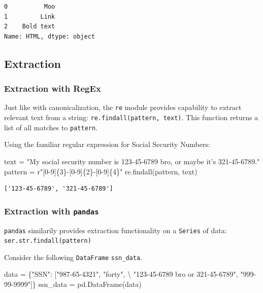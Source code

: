 \documentclass[
  letterpaper,
  DIV=11,
  numbers=noendperiod]{scrreprt}
\newenvironment{Shaded}{\begin{snugshade}}{\end{snugshade}}
\newcommand{\NormalTok}[1]{\textcolor[rgb]{0.00,0.23,0.31}{#1}}
\newcommand{\OperatorTok}[1]{\textcolor[rgb]{0.37,0.37,0.37}{#1}}
\newcommand{\SpecialCharTok}[1]{\textcolor[rgb]{0.37,0.37,0.37}{#1}}
\newcommand{\StringTok}[1]{\textcolor[rgb]{0.13,0.47,0.30}{#1}}
\newcommand{\VerbatimStringTok}[1]{\textcolor[rgb]{0.13,0.47,0.30}{#1}}
\begin{document}
\begin{verbatim}
0          Moo
1         Link
2    Bold text
Name: HTML, dtype: object
\end{verbatim}

\subsection{Extraction}\label{extraction-1}

\subsubsection{Extraction with RegEx}\label{extraction-with-regex}

Just like with canonicalization, the \texttt{re} module provides
capability to extract relevant text from a string:
\texttt{re.findall(pattern,\ text)}. This function returns a list of all
matches to \texttt{pattern}.

Using the familiar regular expression for Social Security Numbers:

\begin{Shaded}
\begin{Highlighting}[]
\NormalTok{text }\OperatorTok{=} \StringTok{"My social security number is 123{-}45{-}6789 bro, or maybe it’s 321{-}45{-}6789."}
\NormalTok{pattern }\OperatorTok{=} \VerbatimStringTok{r"[0{-}9]}\SpecialCharTok{\{3\}}\VerbatimStringTok{{-}[0{-}9]}\SpecialCharTok{\{2\}}\VerbatimStringTok{{-}[0{-}9]}\SpecialCharTok{\{4\}}\VerbatimStringTok{"}
\NormalTok{re.findall(pattern, text)  }
\end{Highlighting}
\end{Shaded}

\begin{verbatim}
['123-45-6789', '321-45-6789']
\end{verbatim}

\subsubsection{\texorpdfstring{Extraction with
\texttt{pandas}}{Extraction with pandas}}\label{extraction-with-pandas}

\texttt{pandas} similarily provides extraction functionality on a
\texttt{Series} of data: \texttt{ser.str.findall(pattern)}

Consider the following \texttt{DataFrame} \texttt{ssn\_data}.

\begin{Shaded}
\begin{Highlighting}[]
\NormalTok{data }\OperatorTok{=}\NormalTok{ \{}\StringTok{"SSN"}\NormalTok{: [}\StringTok{"987{-}65{-}4321"}\NormalTok{, }\StringTok{"forty"}\NormalTok{, }\OperatorTok{\textbackslash{}}
                \StringTok{"123{-}45{-}6789 bro or 321{-}45{-}6789"}\NormalTok{,}
               \StringTok{"999{-}99{-}9999"}\NormalTok{]\}}
\NormalTok{ssn\_data }\OperatorTok{=}\NormalTok{ pd.DataFrame(data)}
\end{Highlighting}
\end{Shaded}
\end{document}
